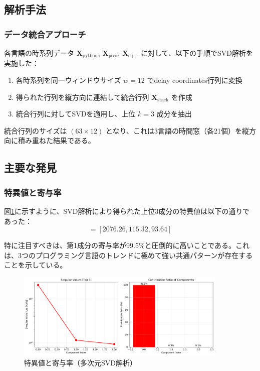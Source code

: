 \documentclass[a4paper,11pt]{jsarticle}
\begin{document}
\subsection{解析手法}

\subsubsection{データ統合アプローチ}

各言語の時系列データ $\mathbf{X}_{\text{python}}$, $\mathbf{X}_{\text{java}}$, $\mathbf{X}_{\text{c++}}$ に対して、以下の手順でSVD解析を実施した：

\begin{enumerate}
  \item 各時系列を同一ウィンドウサイズ $w=12$ でdelay coordinates行列に変換
  \item 得られた行列を縦方向に連結して統合行列 $\mathbf{X}_{\text{stack}}$ を作成
  \item 統合行列に対してSVDを適用し、上位 $k=3$ 成分を抽出
\end{enumerate}

統合行列のサイズは $(63 \times 12)$ となり、これは3言語の時間窓（各21個）を縦方向に積み重ねた結果である。

\subsection{主要な発見}

\subsubsection{特異値と寄与率}

図\ref{fig:multilang-singular-values}に示すように、SVD解析により得られた上位3成分の特異値は以下の通りであった：
\begin{equation}
[\sigma_1, \sigma_2, \sigma_3] = [2076.26, 115.32, 93.64]
\end{equation}

特に注目すべきは、第1成分の寄与率が99.5\%と圧倒的に高いことである。これは、3つのプログラミング言語のトレンドに極めて強い共通パターンが存在することを示している。

\begin{figure}[H]
\centering
\includegraphics[width=0.9\textwidth]{figures/fig8_multilang_singular_values.pdf}
\caption{特異値と寄与率（多次元SVD解析）}
\label{fig:multilang-singular-values}
\end{figure}
\end{document}
